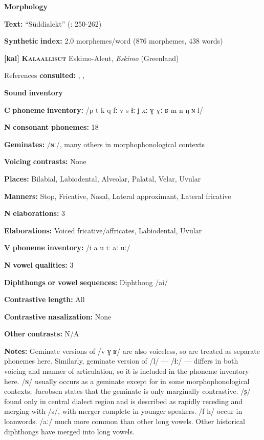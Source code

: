 \begin{styleBody}
\textbf{Morphology}

\textbf{Text:} “Süddialekt” (\citealt{GeorgVolodin1999}: 250-262)

\textbf{Synthetic} \textbf{index:} 2.0 morphemes/word (876 morphemes, 438 words)

\textbf{[kal]}   \textbf{\textsc{Kalaallisut}}    Eskimo-Aleut, \textit{Eskimo} (Greenland)

References \textbf{consulted:} \citet{Fortescue1984}, \citet{Hagerup2011}, \citet{Jacobsen2000}

\textbf{Sound} \textbf{inventory}

\textbf{C} \textbf{phoneme} \textbf{inventory:} /p t k q fː v s ɬː ʝ xː ɣ $\chi ː$ ʁ m n ŋ ɴ l/

\textbf{N} \textbf{consonant} \textbf{phonemes:} 18

\textbf{Geminates:} /ɴː/, many others in morphophonological contexts

\textbf{Voicing} \textbf{contrasts:} None

\textbf{Places:} Bilabial, Labiodental, Alveolar, Palatal, Velar, Uvular

\textbf{Manners:} Stop, Fricative, Nasal, Lateral approximant, Lateral fricative 

\textbf{N} \textbf{elaborations:} 3

\textbf{Elaborations:} Voiced fricative/affricates, Labiodental, Uvular

\textbf{V} \textbf{phoneme} \textbf{inventory:} /i a u iː aː uː/

\textbf{N} \textbf{vowel} \textbf{qualities:} 3

\textbf{Diphthongs} \textbf{or} \textbf{vowel} \textbf{sequences:} Diphthong /ai/

\textbf{Contrastive} \textbf{length:} All

\textbf{Contrastive} \textbf{nasalization:} None

\textbf{Other} \textbf{contrasts:} N/A

\textbf{Notes:} Geminate versions of /v ɣ ʁ/ are also voiceless, so are treated as separate phonemes here. Similarly, geminate version of /l/ — /ɬː/ — differs in both voicing and manner of articulation, so it is included in the phoneme inventory here. /ɴ/ usually occurs as a geminate except for in some morphophonological contexts; Jacobsen states that the geminate is only marginally contrastive. /ʂ/ found only in central dialect region and is described as rapidly receding and merging with /s/, with merger complete in younger speakers. /f h/ occur in loanwords. /aː/ much more common than other long vowels. Other historical diphthongs have merged into long vowels.


\end{styleBody}
